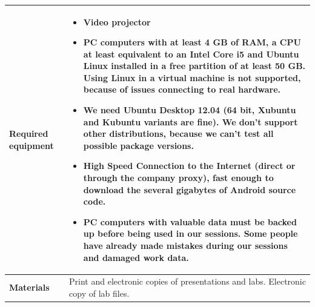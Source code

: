 \documentclass[a4paper,12pt,obeyspaces,spaces,hyphens]{article}
\begin{document}
{\begin{tabularx}{\textwidth}{|g|h|}
    {\bf Required equipment} & \vspace{-0.7cm}
    \begin{itemize}
    \item Video projector
    \item PC computers with at least 4 GB of RAM, a CPU at least
      equivalent to an Intel Core i5 and Ubuntu Linux installed in a
      {\bf free partition of at least 50 GB. Using Linux in a virtual
        machine is not supported}, because of issues connecting to
      real hardware.
    \item We need Ubuntu Desktop 12.04 (64 bit, Xubuntu and Kubuntu
      variants are fine). We don't support other distributions,
      because we can't test all possible package versions.
    \item {\bf High Speed Connection to the Internet} (direct or
      through the company proxy), fast enough to download the several
      gigabytes of Android source code.
    \item {\bf PC computers with valuable data must be backed up}
      before being used in our sessions. Some people have already made
      mistakes during our sessions and damaged work data.
    \end{itemize} \vspace{-0.7cm} \\
    \hline

    {\bf Materials} & Print and electronic copies of presentations and
    labs.
    \newline Electronic copy of lab files.\\
    \hline

\end{tabularx}}
\normalsize
\end{document}
